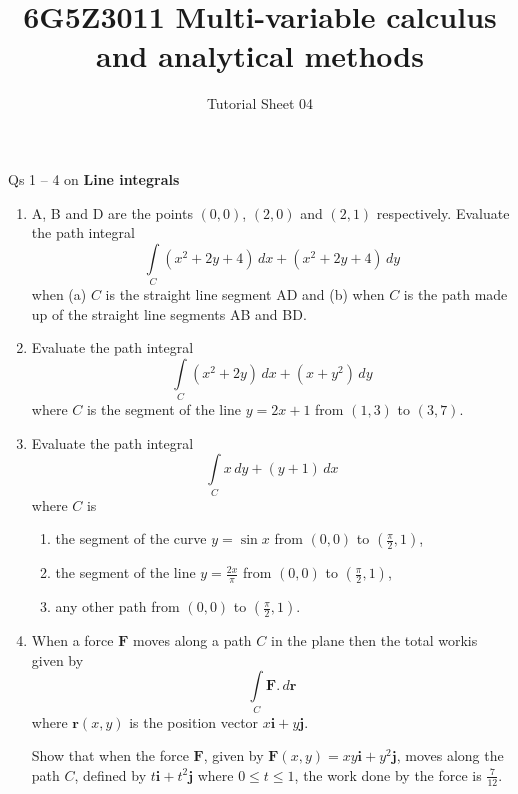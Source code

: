 \documentclass[a4paper]{amsart}
\renewcommand{\b}{\mathbf}
\begin{document}
\title{6G5Z3011 Multi-variable calculus and analytical methods}
\author{Tutorial Sheet 04}
\maketitle

Qs 1 -- 4 on \textbf{Line integrals}
\begin{enumerate}
    \item
    A, B and D are the points $(0,0)$, $(2,0)$ and $(2,1)$ respectively. Evaluate the path integral
    $$\int\limits_C (x^2 + 2y + 4) \, dx + (x^2 + 2y +4) \, dy$$
    when (a) $C$ is the straight line segment AD and (b) when $C$ is the path made up of the straight line segments AB and BD.
    \item
    Evaluate the path integral
    $$\int\limits_C (x^2 + 2y) \, dx + (x + y^2) \, dy $$
    where $C$ is the segment of the line $y=2x+1$ from $(1,3)$ to $(3,7)$.
    \item
    Evaluate the path integral
    $$\int\limits_C x \, dy + (y + 1) \, dx $$
    where $C$ is
    \begin{enumerate}
    \item
    the segment of the curve $y=\sin x$ from $(0,0)$ to $(\frac{\pi}{2},1)$,
    \item
    the segment of the line $y=\frac{2x}{\pi}$ from $(0,0)$ to $(\frac{\pi}{2},1)$,
    \item
    any other path from $(0,0)$ to $(\frac{\pi}{2},1)$.
    \end{enumerate}
    \item
    When a force $\b{F}$ moves along a path $C$ in the plane then the total workis given by
    $$\int\limits_C \b{F} . \, d \b{r}$$
    where $\b{r}(x,y)$ is the position vector $x \b{i} + y \b{j}$.
    
    Show that when the force $\b{F}$, given by $\b{F}(x,y) = xy \b{i} + y^2 \b{j}$, moves along the path $C$, defined by $t \b{i} + t^2 \b{j}$ where $0 \leq t \leq 1$, the work done by the force is $\frac{7}{12}$.
    \end{enumerate}
\end{document}
